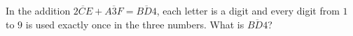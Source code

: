 In the addition $\overline{2CE}+\overline{A3F}=\overline{BD4}$, each letter is a digit and every digit from $1$ to $9$ is used exactly once in the three numbers. What is $\overline{BD4}$?
